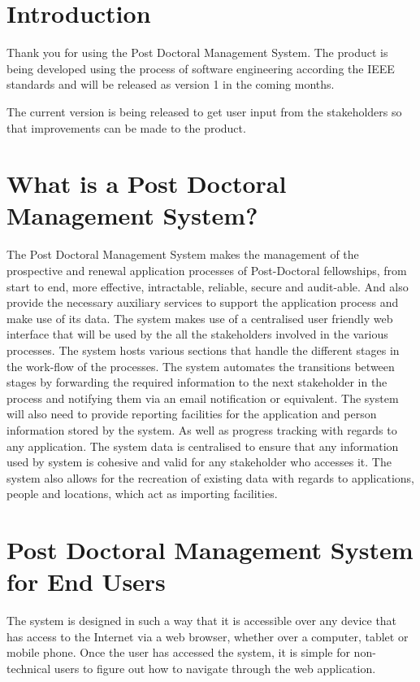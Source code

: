 \documentclass[12pt]{article}
\begin{document}
\listoffigures
\newpage

\section{Introduction}
Thank you for using the Post Doctoral Management System. The product is being developed using the process of software engineering according the IEEE standards and will be released as version 1 in the coming months.

The  current version is being released to get user input from the stakeholders so that improvements can be made to the product.

\section{What is a Post Doctoral Management System?}
The Post Doctoral Management System makes the management of the prospective and renewal application processes of Post-Doctoral fellowships, from start to end, more effective, intractable, reliable, secure and audit-able. And also provide the necessary auxiliary services to support the application process and make use of its data. The system makes use of a centralised user friendly web interface that will be used by the all the stakeholders involved in the various processes. The system hosts various sections that handle the different stages in the work-flow of the processes. The system automates the transitions between stages by forwarding the required information to the next stakeholder in the process and notifying them via an email notification or equivalent. The system will also need to provide reporting facilities for the application and person information stored by the system. As well as progress tracking with regards to any application. The system data is centralised to ensure that any information used by system is cohesive and valid for any stakeholder who accesses it. The system also allows for the recreation of existing data with regards to applications, people and locations, which act as importing facilities.

\section{Post Doctoral Management System for End Users}
The system is designed in such a way that it is accessible over any device that has access to the Internet via a web browser, whether over a computer, tablet or mobile phone. Once the user has accessed the system, it is simple for non-technical users to figure out how to navigate through the web application.
\end{document}
